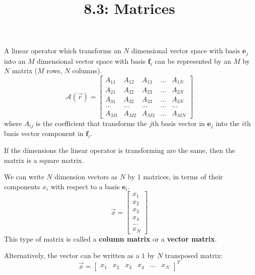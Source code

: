 \documentclass{article}
\title{8.3: Matrices}
\begin{document}
\maketitle
A linear operator which transforms an $N$ dimensional vector space with basis $\mathbf{e}_j$ into an $M$ dimensional vector space with basis $\mathbf{f}_i$ can be represented by an $M$ by $N$ matrix ($M$ rows, $N$ columns).
$$
\mathcal{A}(\vec{r}) = \begin{bmatrix}
    A_{11} & A_{12} & A_{13} & ... & A_{1N}\\
    A_{21} & A_{22} & A_{23} & ... & A_{2N}\\
    A_{31} & A_{32} & A_{33} & ... & A_{3N}\\
    ... & ... & ...& ... & ...\\
    A_{M1} & A_{M2} & A_{M3} & ... & A_{MN}
\end{bmatrix}$$where $A_{ij}$ is the coefficient that transforms the $j$th basis vector in $\mathbf{e}_j$ into the $i$th basis vector component in $\mathbf{f}_i$.

If the dimensions the linear operator is transforming are the same, then the matrix is a square matrix. 

\begin{definition}
We can write $N$ dimension vectors as $N$ by $1$ matrices, in terms of their components $x_i$ with respect to a basis $\mathbf{e}_i$. $$\vec{x} = \begin{bmatrix} x_1 \\ x_2 \\ x_3 \\ x_4 \\ ... \\ x_N\end{bmatrix}$$This type of matrix is called a \textbf{column matrix} or a \textbf{vector matrix}.

Alternatively, the vector can be written as a $1$ by $N$ transposed matrix:$$ \vec{x} = \begin{bmatrix}
    x_1 & x_2 & x_3 & x_4 & ... & x_N
\end{bmatrix}^T$$
\end{definition}
\end{document}
